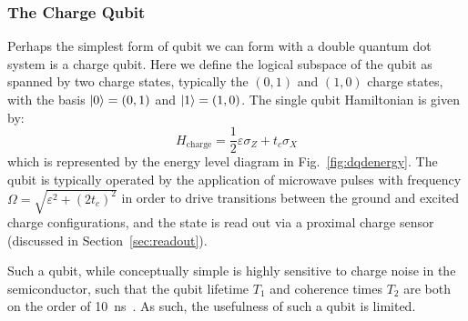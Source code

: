 \subsubsection{The Charge Qubit}
Perhaps the simplest form of qubit we can form with a double quantum dot system is a charge qubit. Here we define
the logical subspace of the qubit as spanned by two charge states, typically the $(0, 1)$ and $(1, 0)$ charge states,
with the basis $\ket{0} = (0, 1)$ and $\ket{1} = (1, 0)$. The single qubit Hamiltonian is given by:
\begin{equation}
  H_{\textrm{charge}} = \frac{1}{2}\varepsilon\sigma_Z + t_c\sigma_X
\end{equation}
which is represented by the energy level diagram in Fig.~\ref{fig:dqdenergy}. The qubit is typically operated by the application
of microwave pulses with frequency $\Omega = \sqrt{\varepsilon^2 + (2 t_c)^2}$ in order to drive transitions between the ground and
excited charge configurations, and the state is read out via a proximal charge sensor (discussed in Section~\ref{sec:readout}).

Such a qubit, while conceptually simple is highly sensitive to charge noise in the semiconductor, such that the qubit lifetime $T_1$ and
coherence times $T_2$ are both on the order of \SI{10}{\nano\second}~\cite{PhysRevLett.105.246804}. As such, the usefulness of such a qubit
is limited.

